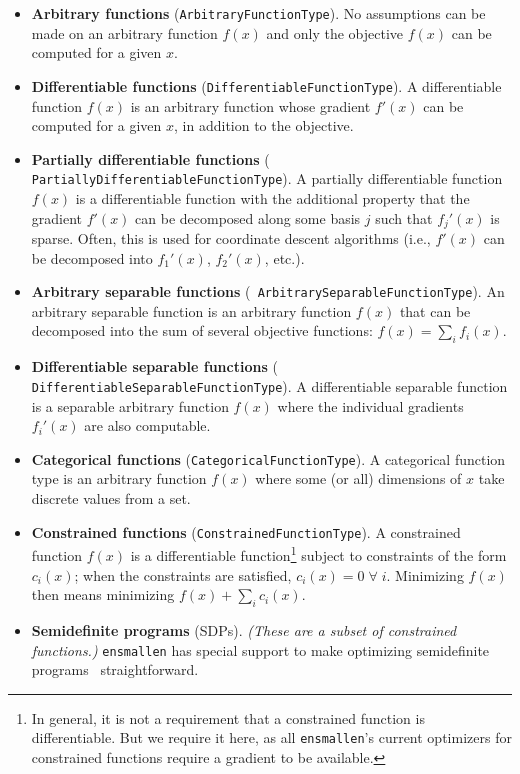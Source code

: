 \begin{itemize}
\item {\bf Arbitrary functions} ({\tt \small ArbitraryFunctionType}).  No
assumptions can be made on an arbitrary function $f(x)$ and only the objective
$f(x)$ can be computed for a given $x$.

\item {\bf Differentiable functions} ({\tt \small DifferentiableFunctionType}).
A differentiable function $f(x)$ is an arbitrary function whose gradient $f'(x)$
can be computed for a given $x$, in addition to the objective.

\item {\bf Partially differentiable functions} ({\tt \small
PartiallyDifferentiableFunctionType}).  A partially differentiable function
$f(x)$ is a differentiable function with the additional property that the
gradient $f'(x)$ can be decomposed along some basis $j$ such that $f_j'(x)$ is
sparse.  Often, this is used for coordinate descent algorithms (i.e., $f'(x)$
can be decomposed into $f_{1}'(x)$, $f_{2}'(x)$, etc.).

\item {\bf Arbitrary separable functions} ({\tt \small
ArbitrarySeparableFunctionType}).  An arbitrary separable function is an
arbitrary function $f(x)$ that can be decomposed into the sum of several
objective functions: $f(x) = \sum\nolimits_i f_i(x)$.

\item {\bf Differentiable separable functions} ({\tt \small
DifferentiableSeparableFunctionType}).  A differentiable separable function is a
separable arbitrary function $f(x)$ where the individual gradients $f_i'(x)$ are
also computable.

\item {\bf Categorical functions} ({\tt \small CategoricalFunctionType}).  A
categorical function type is an arbitrary function $f(x)$ where some (or all)
dimensions of $x$ take discrete values from a set.

\item {\bf Constrained functions} ({\tt \small ConstrainedFunctionType}).  A
constrained function $f(x)$ is a differentiable function\footnote{In general, it
is not a requirement that a constrained function is differentiable.  But we
require it here, as all {\tt ensmallen}'s current optimizers for constrained
functions require a gradient to be available.} subject to constraints of the
form $c_i(x)$; when the constraints are satisfied, $c_i(x) = 0\; \forall \; i$.
Minimizing $f(x)$ then means minimizing $f(x) + \sum_i c_i(x)$.

\item {\bf Semidefinite programs} (SDPs).  {\it (These are a subset of
constrained functions.)}  {\tt ensmallen} has special
support to make optimizing semidefinite
programs~\cite{vandenberghe1996semidefinite} straightforward.
\end{itemize}

